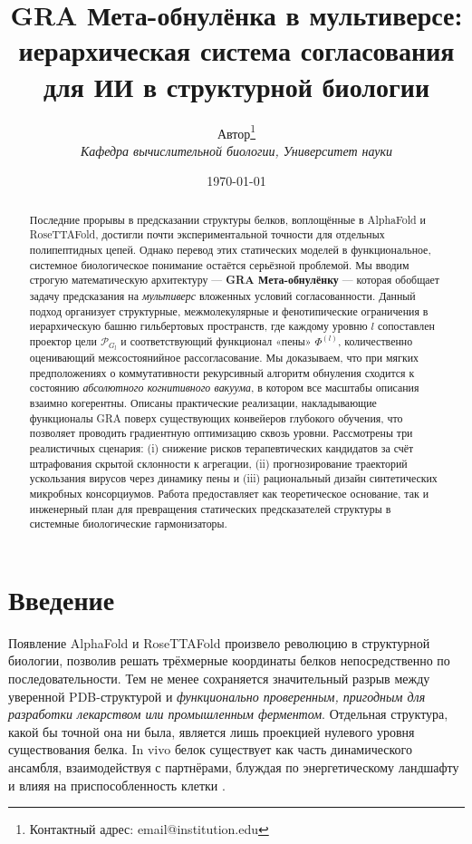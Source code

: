 \documentclass[11pt]{article}
\title{\textbf{GRA Мета-обнулёнка в мультиверсе:\\ иерархическая система согласования для ИИ в структурной биологии}}
\author{Автор\thanks{Контактный адрес: email@institution.edu} \\
\small \textit{Кафедра вычислительной биологии, Университет науки}
}
\date{\today}
\newcommand{\cP}{\mathcal{P}}
\begin{document}
\maketitle

\begin{abstract}
Последние прорывы в предсказании структуры белков, воплощённые в AlphaFold и RoseTTAFold, достигли почти экспериментальной точности для отдельных полипептидных цепей. Однако перевод этих статических моделей в функциональное, системное биологическое понимание остаётся серьёзной проблемой. Мы вводим строгую математическую архитектуру — \textbf{GRA Мета-обнулёнку} — которая обобщает задачу предсказания на \emph{мультиверс} вложенных условий согласованности. Данный подход организует структурные, межмолекулярные и фенотипические ограничения в иерархическую башню гильбертовых пространств, где каждому уровню \(l\) сопоставлен проектор цели \(\cP_{G_l}\) и соответствующий функционал «пены» \(\Phi^{(l)}\), количественно оценивающий межсостоянийное рассогласование. Мы доказываем, что при мягких предположениях о коммутативности рекурсивный алгоритм обнуления сходится к состоянию \emph{абсолютного когнитивного вакуума}, в котором все масштабы описания взаимно когерентны. Описаны практические реализации, накладывающие функционалы GRA поверх существующих конвейеров глубокого обучения, что позволяет проводить градиентную оптимизацию сквозь уровни. Рассмотрены три реалистичных сценария: (i) снижение рисков терапевтических кандидатов за счёт штрафования скрытой склонности к агрегации, (ii) прогнозирование траекторий ускользания вирусов через динамику пены и (iii) рациональный дизайн синтетических микробных консорциумов. Работа предоставляет как теоретическое основание, так и инженерный план для превращения статических предсказателей структуры в системные биологические гармонизаторы.
\end{abstract}

\section{Введение}

Появление AlphaFold \cite{jumper2021highly} и RoseTTAFold \cite{baek2021accurate} произвело революцию в структурной биологии, позволив решать трёхмерные координаты белков непосредственно по последовательности. Тем не менее сохраняется значительный разрыв между уверенной PDB-структурой и \emph{функционально проверенным, пригодным для разработки лекарством или промышленным ферментом}. Отдельная структура, какой бы точной она ни была, является лишь проекцией нулевого уровня существования белка. In vivo белок существует как часть динамического ансамбля, взаимодействуя с партнёрами, блуждая по энергетическому ландшафту и влияя на приспособленность клетки \cite{noauthor_rosettafold_2021}.
\end{document}
